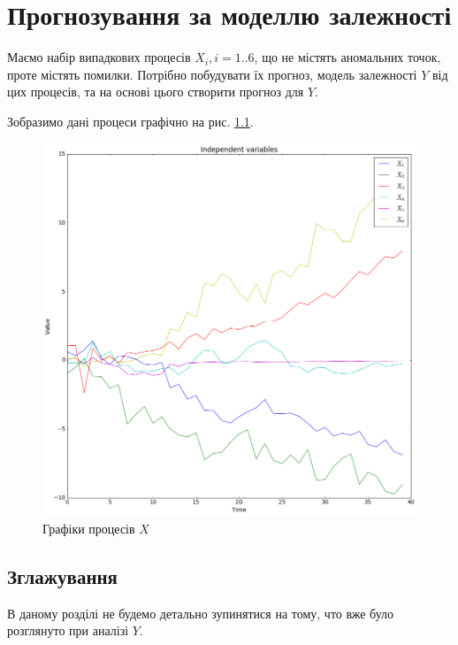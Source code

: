 \chapter{Прогнозування за моделлю залежності}

Маємо набір випадкових процесів $X_i, i=1..6$,
що не містять аномальних точок,
проте містять помилки.
Потрібно побудувати їх прогноз,
модель залежності $Y$ від цих процесів,
та на основі цього створити прогноз для $Y$.

Зобразимо дані процеси графічно на рис. \ref{fig:x:source}.
\begin{figure}[h!]
  \centering
  \includegraphics[width=\textwidth]{Coursework2_files/Coursework2_6_0.png}
  \caption{Графіки процесів $X$}
  \label{fig:x:source}
\end{figure}

\section{Зглажування}

В даному розділі не будемо детально зупинятися на тому,
что вже було розглянуто при аналізі $Y$.

